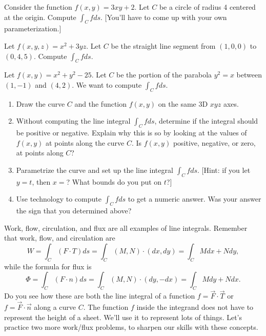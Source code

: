 \begin{problem}%
%
 Consider the function $f(x,y)=3xy+2$. Let $C$ be a circle of radius 4 centered at the origin.  Compute $\int_C fds$.  [You'll have to come up with your own parameterization.]
\end{problem}


\begin{problem}%
%
 Let $f(x,y,z)=x^2+3yz$. Let $C$ be the straight line segment from $(1,0,0)$ to $(0,4,5)$. Compute $\int_C f ds$. 
\end{problem}

\begin{problem}%
%
%
 Let $f(x,y)=x^2+y^2-25$. Let $C$ be the portion of the parabola $y^2=x$ between $(1,-1)$ and $(4,2)$. We want to compute $\int_C fds$.  
\begin{enumerate}
\item Draw the curve $C$ and the function $f(x,y)$ on the same 3D $xyz$ axes.
\item Without computing the line integral $\int_C fds$, determine if the integral should be positive or negative. Explain why this is so by looking at the values of $f(x,y)$ at points along the curve $C$.  Is $f(x,y)$ positive, negative, or zero, at points along $C$?
 \item Parametrize the curve and set up the line integral $\int_C f ds$. [Hint: if you let $y=t$, then $x=$? What bounds do you put on $t$?]
 \item Use technology to compute $\int_C fds$ to get a numeric answer.  Was your answer the sign that you determined above?
\end{enumerate}
\end{problem}






Work, flow, circulation, and flux are all examples of line integrals.  Remember that work, flow, and circulation are 
$$W=\int_C (F\cdot T)ds =\int_C (M,N)\cdot(dx,dy) =  \int_C Mdx+Ndy,$$
while the formula for flux is
$$\Phi=\int_C (F\cdot n)ds =\int_C (M,N)\cdot(dy,-dx) =  \int_C Mdy+Ndx.$$
Do you see how these are both the line integral of a function $f = \vec F\cdot \vec T$ or $f=\vec F\cdot \vec n$ along a curve $C$.  The function $f$ inside the integrand does not have to represent the height of a sheet. We'll use it to represent lots of things.  Let's practice two more work/flux problems, to sharpen our skills with these concepts. 






